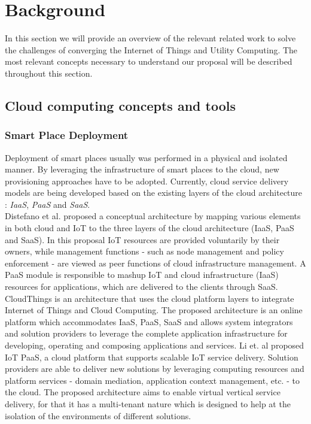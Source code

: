 
\section{Background}
\label{sec:background}
In this section we will provide an overview of the relevant related work to solve the challenges of
converging the Internet of Things and Utility Computing. The most relevant concepts necessary to
understand our proposal will be described throughout this section.

\subsection{Cloud computing concepts and tools}
\label{sub:cloud_concepts_tools}

\subsubsection{Smart Place Deployment}
\label{sub:smart_place_deployment}
Deployment of smart places usually was performed in a physical and isolated manner. By leveraging the
infrastructure of smart places to the cloud, new provisioning approaches have to be adopted. Currently,
cloud service delivery models are being developed based on the existing layers of the cloud
architecture \cite{zhang2010cloud}: \textit{IaaS}, \textit{PaaS} and \textit{SaaS}.\\

Distefano et al. \cite{distefano2012enabling} proposed a conceptual architecture by
mapping various elements in both cloud and IoT to the three layers of the cloud architecture (\gls{IaaS},
\gls{PaaS} and \gls{SaaS}). In this proposal IoT resources are provided voluntarily by their owners,
while management functions - such as node management and policy enforcement - are viewed as peer
functions of cloud infrastructure management. A \gls{PaaS} module is responsible to mashup IoT and
cloud infrastructure (\gls{IaaS}) resources for applications, which are delivered to the clients
through \gls{SaaS}.
CloudThings \cite{zhou2013cloudthings} is an architecture that uses the cloud platform layers to
integrate Internet of Things and Cloud Computing. The proposed architecture is an online platform
which accommodates \gls{IaaS}, \gls{PaaS}, \gls{SaaS} and allows system integrators and solution
providers to leverage the complete application infrastructure for developing, operating and composing
applications and services.
Li et. al \cite{li2013efficient} proposed IoT PaaS, a cloud platform that supports
scalable IoT service delivery. Solution providers are able to deliver new solutions by leveraging
computing resources and platform services - domain mediation, application context management, etc.
- to the cloud. The proposed architecture aims to enable virtual vertical service delivery, for that
it has a multi-tenant nature which is designed to help at the isolation of the environments of
different solutions.\\

